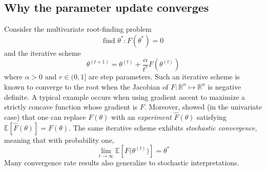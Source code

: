 \documentclass[preprint,12pt,authoryear]{elsarticle}
\begin{document}

\subsection{Why the parameter update converges}
Consider the multivariate root-finding problem \[\text{find } \theta^*: F(\theta^*) = 0\]
and the iterative scheme \[\theta^{(t+1)} = \theta^{(t)} + \frac{\alpha}{t^r} F\left(\theta^{(t)} \right)\]
where $\alpha >0$ and $r \in (0, 1]$ are step parameters. Such an iterative scheme is known to converge to the root when the Jacobian of $F: \mathbb{R}^n \mapsto \mathbb{R}^n$ is negative definite. A typical example occurs when using gradient ascent to maximize a strictly concave function whose gradient is $F$. Moreover, \cite{robbinsmonro1951} showed (in the univariate case) that one can replace $F(\theta)$ with an \emph{experiment} $\hat F(\theta)$ satisfying $\mathbb{E}\left[\hat F(\theta)\right] = F(\theta)$. The same iterative scheme exhibits \emph{stochastic convergence}, meaning that with probability one,
\[\lim_{t\to \infty} \mathbb{E}\left[F\bigl(\theta^{(t)}\bigr)\right] = \theta^*\]
Many convergence rate results also generalize to stochastic interpretations.
\end{document}
